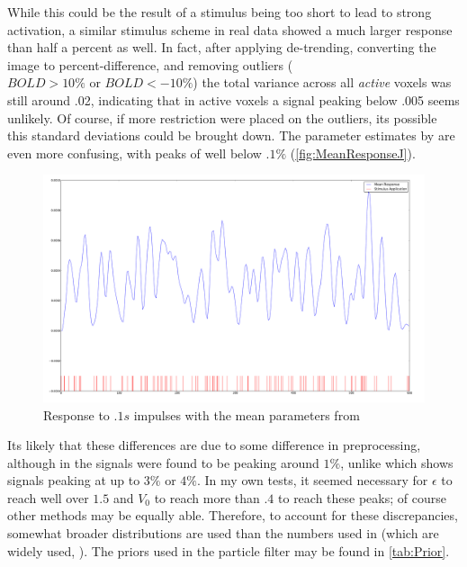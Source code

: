 While this could be the result of a stimulus
being too short to lead to strong activation, a similar stimulus
scheme in real data showed a much larger response than 
half a percent as well. In fact, after applying de-trending,
converting the image to percent-difference, and removing 
outliers ($ BOLD > 10\% \text{ or } BOLD < -10\%$) the total variance
across all \emph{active} voxels was still around .02, indicating
that in active voxels a signal peaking below .005 seems unlikely. 
Of course, if more restriction were placed on the outliers, its possible
this standard deviations could be brought down. 
The parameter estimates by \cite{Johnston2008} are even more 
confusing, with peaks of well below $.1\%$ (\autoref{fig:MeanResponseJ}).

\begin{figure}
\centering
\label{fig:MeanResponseJ}
\includegraphics[trim=6cm 3cm 6cm 3cm,width=16cm]{images/mean_response_johnston}
\caption{Response to $.1s$ impulses with the mean parameters from \cite{Johnston2008}}
\end{figure}

Its likely that these differences are due to some difference in preprocessing,
although in \cite{Deneux2006} the signals were found to be peaking around
$1\%$, unlike \cite{Friston2000} which shows signals peaking at up to
$3\%$ or $4\%$. In my own tests, it seemed necessary for $\epsilon$ to
reach well over $1.5$ and $V_0$ to reach more than $.4$ to reach these
peaks; of course other methods may be equally able. 
Therefore, to account for these discrepancies, somewhat broader
distributions are used than the numbers used in \cite{Friston2000}
(which are widely used, \cite{Hu2009}). The 
priors used in the particle filter may be found in \autoref{tab:Prior}.

